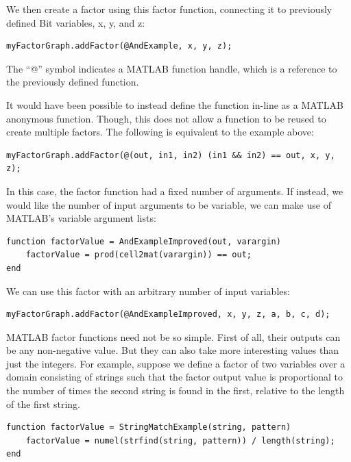 We then create a factor using this factor function, connecting it to previously defined Bit variables, x, y, and z:

\begin{lstlisting}
myFactorGraph.addFactor(@AndExample, x, y, z);	
\end{lstlisting}

The ``@'' symbol indicates a MATLAB function handle, which is a reference to the previously defined function.

It would have been possible to instead define the function in-line as a MATLAB anonymous function.  Though, this does not allow a function to be reused to create multiple factors.  The following is equivalent to the example above:

\begin{lstlisting}
myFactorGraph.addFactor(@(out, in1, in2) (in1 && in2) == out, x, y, z);	
\end{lstlisting}

In this case, the factor function had a fixed number of arguments.  If instead, we would like the number of input arguments to be variable, we can make use of MATLAB's variable argument lists:

\begin{lstlisting}
function factorValue = AndExampleImproved(out, varargin)
    factorValue = prod(cell2mat(varargin)) == out;
end
\end{lstlisting}

We can use this factor with an arbitrary number of input variables:

\begin{lstlisting}
myFactorGraph.addFactor(@AndExampleImproved, x, y, z, a, b, c, d);	
\end{lstlisting}


MATLAB factor functions need not be so simple.  First of all, their outputs can be any non-negative value.  But they can also take more interesting values than just the integers.  For example, suppose we define a factor of two variables over a domain consisting of strings such that the factor output value is proportional to the number of times the second string is found in the first, relative to the length of the first string.

\begin{lstlisting}
function factorValue = StringMatchExample(string, pattern)
    factorValue = numel(strfind(string, pattern)) / length(string);
end
\end{lstlisting}

